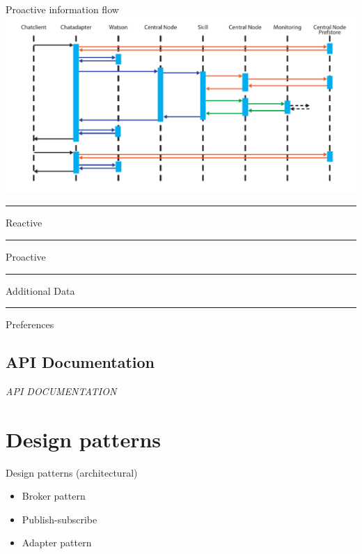 \documentclass[10pt]{beamer}
\newcommand\crule[3][black]{\textcolor{#1}{\rule{#2}{#3}}}
\begin{document}
\begin{frame}{Proactive information flow}
  \includegraphics[width=\textwidth,page=2]{ProcessFlows}
  
  \crule[aswe-reactive]{0.2cm}{0.2cm} Reactive \hspace{0.3cm}
  \crule[aswe-proactive]{0.2cm}{0.2cm} Proactive \hspace{0.3cm}
  \crule[aswe-data]{0.2cm}{0.2cm} Additional Data \hspace{0.3cm}
  \crule[aswe-preferences]{0.2cm}{0.2cm} Preferences
\end{frame}

\subsection{API Documentation}

\begin{frame}
  \begin{center}
    \Large \textit{API DOCUMENTATION}
  \end{center}
\end{frame}

\section{Design patterns}

\begin{frame}{Design patterns (architectural)}
  \begin{itemize}
    \item Broker pattern
    \item Publish-subscribe
    \item Adapter pattern
  \end{itemize}
\end{frame}
\end{document}
